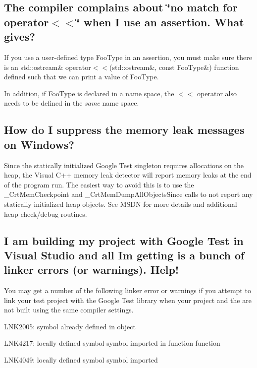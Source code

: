 \subsection*{The compiler complains about \char`\"{}no match for \textquotesingle{}operator$<$$<$\textquotesingle{}\char`\"{} when I use an assertion. What gives?}

If you use a user-\/defined type {\ttfamily Foo\+Type} in an assertion, you must make sure there is an {\ttfamily std\+::ostream\& operator$<$$<$(std\+::ostream\&, const Foo\+Type\&)} function defined such that we can print a value of {\ttfamily Foo\+Type}.

In addition, if {\ttfamily Foo\+Type} is declared in a name space, the {\ttfamily $<$$<$} operator also needs to be defined in the {\itshape same} name space.

\subsection*{How do I suppress the memory leak messages on Windows?}

Since the statically initialized Google Test singleton requires allocations on the heap, the Visual C++ memory leak detector will report memory leaks at the end of the program run. The easiest way to avoid this is to use the {\ttfamily \+\_\+\+Crt\+Mem\+Checkpoint} and {\ttfamily \+\_\+\+Crt\+Mem\+Dump\+All\+Objects\+Since} calls to not report any statically initialized heap objects. See M\+S\+DN for more details and additional heap check/debug routines.

\subsection*{I am building my project with Google Test in Visual Studio and all I\textquotesingle{}m getting is a bunch of linker errors (or warnings). Help!}

You may get a number of the following linker error or warnings if you attempt to link your test project with the Google Test library when your project and the are not built using the same compiler settings.


\begin{DoxyItemize}
\item L\+N\+K2005\+: symbol already defined in object
\item L\+N\+K4217\+: locally defined symbol \textquotesingle{}symbol\textquotesingle{} imported in function \textquotesingle{}function\textquotesingle{}
\item L\+N\+K4049\+: locally defined symbol \textquotesingle{}symbol\textquotesingle{} imported
\end{DoxyItemize}

